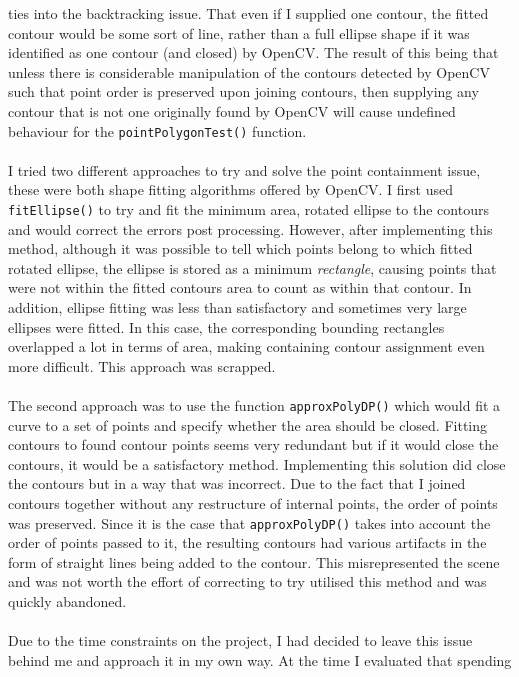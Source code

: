 \documentclass[11pt]{article}
\begin{document}
ties into the backtracking issue. That even if I supplied one contour, the
fitted contour would be some sort of line, rather than a full ellipse
shape if it was identified as one contour (and closed) by OpenCV. The result
of this being that unless there is considerable manipulation of the contours
detected by OpenCV such that point order is preserved upon joining contours,
then supplying any contour that is not one originally found by OpenCV will
cause undefined behaviour for the \texttt{pointPolygonTest()} function.\\
\\
I tried two different approaches to try and solve the point containment issue,
these were both shape fitting algorithms offered by OpenCV. I first used
\texttt{fitEllipse()} to try and fit the minimum area, rotated ellipse to
the contours and would correct the errors post processing. However, after
implementing this method, although it was possible to tell which points belong
to which fitted rotated ellipse, the ellipse is stored as a minimum 
\textit{rectangle}, causing points that were not within the fitted contours
area to count as within that contour. In addition, ellipse fitting was less
than satisfactory and sometimes very large ellipses were fitted. In this case,
the corresponding bounding rectangles overlapped a lot in terms of area, making
containing contour assignment even more difficult. This approach was scrapped.\\
\\
The second approach was to use the function \texttt{approxPolyDP()} which 
would fit a curve to a set of points and specify whether the area should be
closed. Fitting contours to found contour points seems very redundant but if
it would close the contours, it would be a satisfactory method. Implementing
this solution did close the contours but in a way that was incorrect. 
Due to the fact that I joined contours together without any restructure
of internal points, the order of points was preserved. Since it is the case
that \texttt{approxPolyDP()} takes into account the order of points passed
to it, the resulting contours had various artifacts in the form of straight
lines being added to the contour. This misrepresented the scene and was not
worth the effort of correcting to try utilised this method and was
quickly abandoned.\\
\\
Due to the time constraints on the project, I had decided to leave this issue
behind me and approach it in my own way. At the time I evaluated that spending
\end{document}
